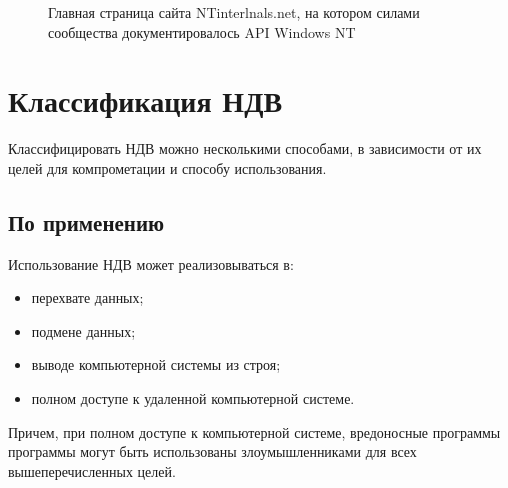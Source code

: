 \begin{figure}[!htbp]
    \caption{Главная страница сайта NTinterlnals.net,
             на котором силами сообщества
             документировалось API Windows NT \label{fig:nt-internals}}
\end{figure}

\section{Классификация НДВ}\label{sec:ch1/sec2}
Классифицировать НДВ можно несколькими способами, в
зависимости от их целей для компрометации и способу использования.
    \subsection{По применению}\label{sec:ch1/sec2/sub1}
    Использование НДВ может реализовываться в:
    \begin{itemize}
        \item перехвате данных;
        \item подмене данных;
        \item выводе компьютерной системы из строя;
        \item полном доступе к удаленной компьютерной системе.
    \end{itemize}
    Причем, при полном доступе к компьютерной системе, вредоносные программы
    программы могут быть использованы злоумышленниками для
    всех вышеперечисленных целей.

